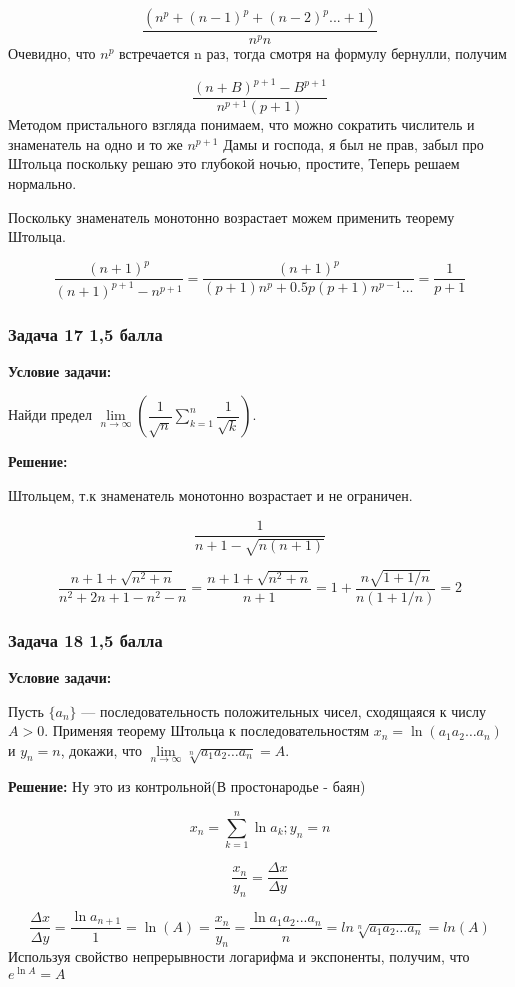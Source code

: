 \documentclass[a4paper,12pt]{article}
\begin{document}
\[
\frac{(n^p + (n-1)^{p}+(n-2)^p...+1)}{n^{p}n}
\]
Очевидно, что $n^p$ встречается n раз, тогда смотря на формулу бернулли, получим

\[
\frac{(n+B)^{p+1}-B^{p+1}}{n^{p+1}(p+1)}
\]
Методом пристального взгляда понимаем, что можно сократить числитель и знаменатель на одно и то же $n^{p+1}$
Дамы и господа, я был не прав, забыл про Штольца поскольку решаю это глубокой ночью, простите, Теперь решаем нормально.

Поскольку знаменатель монотонно возрастает можем применить теорему Штольца. 

\[
\frac{(n+1)^p}{(n+1)^{p+1} - n^{p+1}} = \frac{(n+1)^p}{(p+1)n^p+0.5p(p+1)n^{p-1}...}=\frac{1}{p+1}
\]


\vspace{1cm}

\subsubsection{Задача 17 \hfill 1,5 балла}

\textbf{Условие задачи:}

Найди предел \( \lim\limits_{n \to \infty} \left( \dfrac{1}{\sqrt{n}} \sum\limits_{k=1}^{n} \dfrac{1}{\sqrt{k}} \right) \).

\textbf{Решение: }

Штольцем, т.к знаменатель монотонно возрастает и не ограничен.

\[
\frac{1}{n+1-\sqrt{n(n+1)}}
\]

\[
\frac{n+1+\sqrt{n^2+n}}{n^2+2n+1-n^2-n}=\frac{n+1+\sqrt{n^2+n}}{n+1}= 1+ \frac{n\sqrt{1+1/n}}{n(1+1/n)}=2
\]

\vspace{1cm}

\subsubsection{Задача 18 \hfill 1,5 балла}

\textbf{Условие задачи:}

Пусть \( \{ a_n \} \) — последовательность положительных чисел, сходящаяся к числу \( A > 0 \). Применяя теорему Штольца к последовательностям \( x_n = \ln(a_1 a_2 \dots a_n) \) и \( y_n = n \), докажи, что \( \lim\limits_{n \to \infty} \sqrt[n]{a_1 a_2 \dots a_n} = A \).

\textbf{Решение: }
Ну это из контрольной(В простонародье - баян)

\[
x_n = \sum_{k=1}^{n} \ln{a_k}; y_n = n
\]

\[
\frac{x_n}{y_n}=\frac{\Delta x}{\Delta y} 
\]

\[
\frac{\Delta x}{\Delta y}=\frac{\ln{a_{n+1}}}{1}=\ln(A)=\frac{x_n}{y_n}=\frac{\ln{a_1a_2...a_n}}{n}=ln{\sqrt[n]{a_1 a_2 \dots a_n}}=ln(A)
\]
Используя свойство непрерывности логарифма и экспоненты, получим, что $e^{\ln{A}}=A$
\vspace{1cm}
\end{document}

